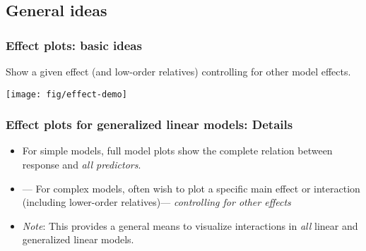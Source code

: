 \renewcommand{\FileName}{effplot1}
\subsection{General ideas}
\begin{frame}
 \frametitle{Effect plots: basic ideas}
Show a given effect (and low-order relatives) controlling for other model effects.
\begin{center}
 \texttt{[image: fig/effect-demo]}
\end{center}
\end{frame}
 
\begin{frame}
  \frametitle{Effect plots for generalized linear models: Details}
  \begin{itemize}
    \item For simple models, full model plots show the complete relation between response
	and \emph{all predictors}.
	\item \citet{Fox:87}--- For complex models, often wish to plot a specific main effect or
	interaction (including lower-order relatives)--- \emph{controlling for other effects}
	\item \emph{Note}: This provides a general means to visualize interactions in \emph{all} linear and generalized
	linear models.
  \end{itemize}
  
\end{frame}

